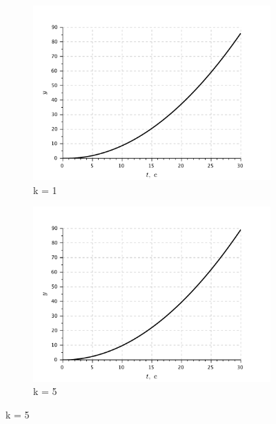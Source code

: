 \documentclass[a4paper, 11pt]{article}
\begin{document}
\begin{figure}[h!]

    \begin{subfigure}{0.5\textwidth}
        \centering
        \includegraphics[width = \textwidth]{images/graph2-3-K1.pdf}
        \caption{k = 1}
    \end{subfigure}
    \begin{subfigure}{0.5\textwidth}
        \centering
        \includegraphics[width = \textwidth]{images/graph2-3-K5.pdf}
        \caption{k = 5}
    \end{subfigure}


\end{figure}
\end{document}
